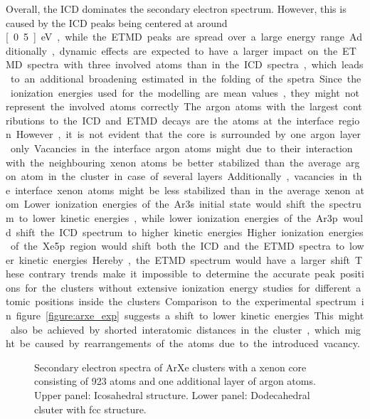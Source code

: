Overall, the ICD dominates the secondary electron spectrum. However, this
is caused by the ICD peaks being centered at around \unit[0.5]{eV}, while
the ETMD peaks are spread over a large energy range. Additionally, dynamic
effects are expected to have a larger impact on the ETMD spectra with three
involved atoms than in the ICD spectra, which leads to an additional
broadening estimated in the folding of the spetra.




Since the ionization energies used for the modelling are mean values, they
might not represent the involved atoms correctly. The argon atoms with the
largest contributions to the ICD and ETMD decays are the atoms at the interface
region. However, it is not evident that the core is surrounded by one argon
layer only. Vacancies in the interface argon atoms might due to
their interaction with the
neighbouring xenon atoms be better stabilized than the average argon atom in the
cluster in case of several layers. Additionally, vacancies in the interface
xenon atoms might be less stabilized than in the average xenon atom.
Lower ionization energies of the Ar3s initial state would shift the spectrum
to lower kinetic energies, while lower ionization energies of the Ar3p
would shift the \ac{ICD} spectrum to higher kinetic energies.
Higher ionization energies of the Xe5p region would shift both the ICD and
the ETMD spectra to lower kinetic energies. Hereby, the ETMD spectrum would
have a larger shift. These contrary trends make it impossible to determine the
accurate peak positions for the clusters without extensive ionization energy
studies for different atomic positions inside the clusters.
Comparison to the experimental spectrum in figure \ref{figure:arxe_exp}
suggests a shift to lower kinetic energies.
This might also be achieved by shorted interatomic distances in the cluster,
which might be caused by rearrangements of the atoms due to the introduced
vacancy.


\begin{figure}[]
 \centering
 
 
 \caption{Secondary electron spectra of ArXe clusters with a xenon core
          consisting of 923 atoms and one additional layer of argon atoms.\\
          Upper panel: Icosahedral structure. Lower panel: Dodecahedral
          clsuter with fcc structure.}
 \label{figure:exp_923_arxe}
\end{figure}


